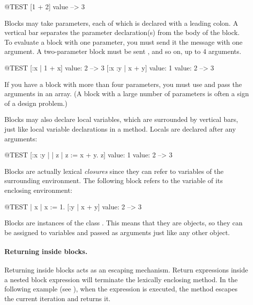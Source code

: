 \documentclass[a4paper,10pt,twoside]{book}
\begin{document}
\begin{code}{@TEST}
[1 + 2] value --> 3
\end{code}

Blocks may take parameters, each of which is declared with a leading colon.
A  vertical bar separates the parameter declaration(s) from the body of the block.
To evaluate a block with one parameter, you must send it the message  with one argument.
A two-parameter block must be sent , and so on, up to 4 arguments.

\begin{code}{@TEST}
[:x | 1 + x] value: 2 --> 3
[:x :y | x + y] value: 1 value: 2 --> 3
\end{code}

If you have a block with more than four parameters, you must use  and pass the arguments in an array.
(A block with a large number of parameters is often a sign of a design problem.)

Blocks may also declare local variables, which are surrounded by vertical bars, just like local variable declarations in a method.
Locals are declared after any arguments:

\begin{code}{@TEST}
[:x :y | | z | z := x + y. z] value: 1 value: 2 --> 3
\end{code}

Blocks are actually lexical \emph{closures} since they can refer to variables of the surrounding environment.
The following block refers to the variable  of its enclosing environment:

\begin{code}{@TEST}
| x |
x := 1.
[:y | x + y] value: 2 --> 3
\end{code}

Blocks are instances of the class .
This means that they are objects, so they can be assigned to variables and passed as arguments just like any other object.

\paragraph{Returning inside blocks.}
Returning inside blocks acts as an escaping mechanism. 
Return expressions inside a nested block expression will terminate the lexically enclosing method.
In the following example (see ), when the expression  is executed, the method  escapes the current iteration and returns it. 
\end{document}
